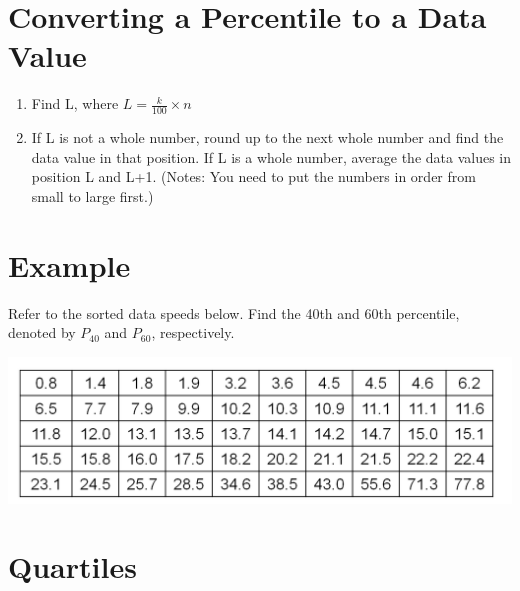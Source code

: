 \documentclass[]{book}
\providecommand{\tightlist}{%
  \setlength{\itemsep}{0pt}\setlength{\parskip}{0pt}}
\begin{document}
\hypertarget{converting-a-percentile-to-a-data-value}{%
\section{Converting a Percentile to a Data Value}\label{converting-a-percentile-to-a-data-value}}

\begin{enumerate}
\def\labelenumi{\arabic{enumi}.}
\tightlist
\item
  Find L, where \(L=\frac{k}{100}\times n\)
\item
  If L is not a whole number, round up to the next whole number and find the data value in that position. If L is a whole number, average the data values in position L and L+1. (Notes: You need to put the numbers in order from small to large first.)
\end{enumerate}

\hypertarget{example-5}{%
\section{Example}\label{example-5}}

Refer to the sorted data speeds below. Find the 40th and 60th percentile, denoted by \(P_{40}\) and \(P_{60}\), respectively.

\includegraphics{pic13.png}

\hypertarget{quartiles}{%
\section{Quartiles}\label{quartiles}}
\end{document}
